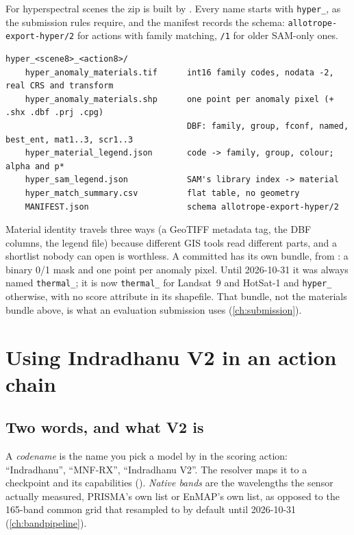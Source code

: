 For hyperspectral scenes the zip is built by . Every name starts with
\texttt{hyper\_}, as the submission rules require, and the manifest records the schema:
\texttt{allotrope-export-hyper/2} for actions with family matching, \texttt{/1} for older SAM-only ones.
\begin{lstlisting}[language={}]
hyper_<scene8>_<action8>/
    hyper_anomaly_materials.tif      int16 family codes, nodata -2, real CRS and transform
    hyper_anomaly_materials.shp      one point per anomaly pixel (+ .shx .dbf .prj .cpg)
                                     DBF: family, group, fconf, named, best_ent, mat1..3, scr1..3
    hyper_material_legend.json       code -> family, group, colour; alpha and p*
    hyper_sam_legend.json            SAM's library index -> material
    hyper_match_summary.csv          flat table, no geometry
    MANIFEST.json                    schema allotrope-export-hyper/2
\end{lstlisting}
Material identity travels three ways (a GeoTIFF metadata tag, the DBF columns, the legend file) because
different GIS tools read different parts, and a shortlist nobody can open is worthless. A committed
 has its own bundle, from : a binary 0/1 mask and
one point per anomaly pixel. Until 2026-10-31 it was always named \texttt{thermal\_}; it is now \texttt{thermal\_}
for Landsat~9 and HotSat-1 and \texttt{hyper\_} otherwise, with no score attribute in its shapefile. That bundle, not
the materials bundle above, is what an evaluation submission uses (\cref{ch:submission}).

\section{Using Indradhanu V2 in an action chain}\label{sec:material:v2}

\subsection{Two words, and what V2 is}

A \emph{codename} is the name you pick a model by in the scoring action: ``Indradhanu'',
``MNF-RX'', ``Indradhanu V2''. The resolver maps it to a checkpoint and its capabilities
(). \emph{Native bands} are the
wavelengths the sensor actually measured, PRISMA's own list or EnMAP's own list, as opposed to the 165-band
common grid that  resampled to by default until 2026-10-31 (\cref{ch:bandpipeline}).

